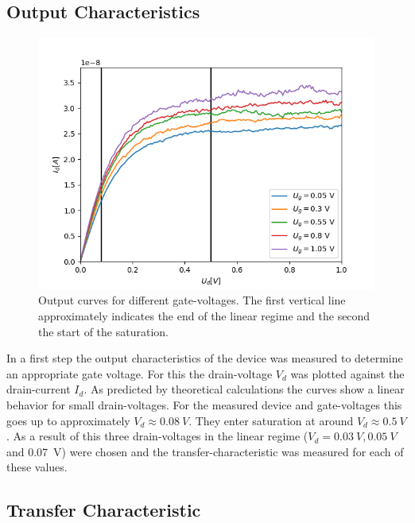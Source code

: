 \documentclass[%
 reprint,
amsmath,amssymb,
pra,
]{revtex4-1}
\begin{document}
\subsection{Output Characteristics}
\begin{figure}
\centering
\includegraphics[scale=0.55]{Bilder/output.png}
\caption{Output curves for different gate-voltages. The first vertical line approximately indicates the end of the linear regime and the second the start of the saturation.}
\label{fig:output}
\end{figure}

In a first step the output characteristics of the device was measured to determine an appropriate gate voltage. For this the drain-voltage  $V_d$ was plotted against the drain-current $I_d$. As predicted by theoretical calculations the curves show a linear behavior for small drain-voltages. For the measured device and gate-voltages this goes up to approximately $V_d \approx \SI{0.08}{V}$. They enter saturation at around $V_d \approx \SI{0.5}{V}$. As a result of this three drain-voltages in the linear regime ($V_d = \SI{0.03}{V},\SI{0.05}{V} $ and \SI{0.07}{V}) were chosen and the transfer-characteristic was measured for each of these values.

\subsection{Transfer Characteristic}
\end{document}
